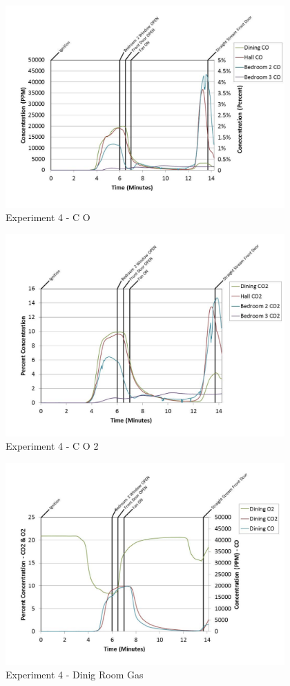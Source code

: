 \documentclass{article}
\begin{document}
\begin{appendices}
	\begin{figure}[h!]
		\centering
		\includegraphics[height=3.05in]{0_Images/Results_Charts/Exp_4_Charts/CO.pdf}
		\caption{Experiment 4 - C O}
	\end{figure}
 
	\clearpage

	\begin{figure}[h!]
		\centering
		\includegraphics[height=3.05in]{0_Images/Results_Charts/Exp_4_Charts/CO2.pdf}
		\caption{Experiment 4 - C O 2}
	\end{figure}
 

	\begin{figure}[h!]
		\centering
		\includegraphics[height=3.05in]{0_Images/Results_Charts/Exp_4_Charts/DinigRoomGas.pdf}
		\caption{Experiment 4 - Dinig Room Gas}
	\end{figure}
 

\end{appendices}
\end{document}
